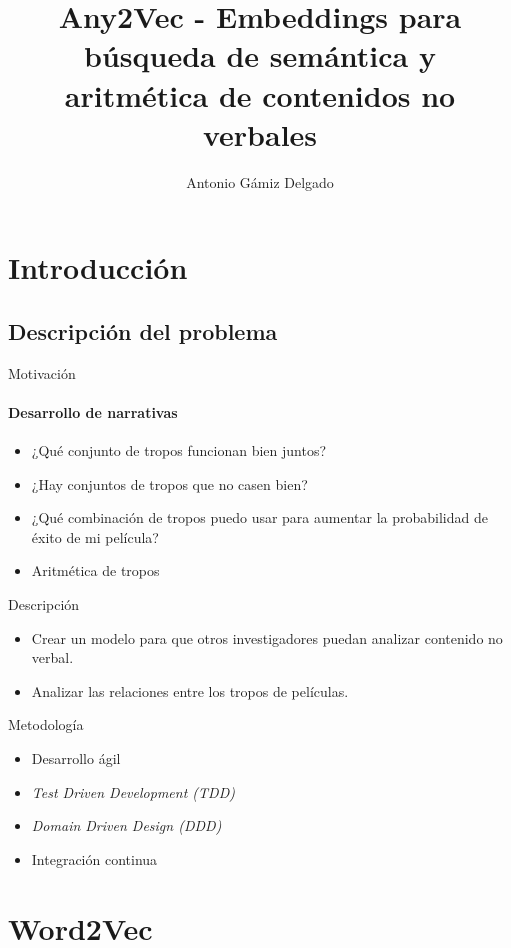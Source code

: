 \documentclass{beamer}
\title[Any2Vec - Embeddings para búsqueda de semántica y aritmética de contenidos no verbales]{Any2Vec - Embeddings para búsqueda de semántica y aritmética de contenidos no verbales}
\author[A. Gámiz]{Antonio Gámiz Delgado}
\begin{document}
	\typesetFrontSlides


\section{Introducción}

\subsection[Problema]{Descripción del problema}

\begin{frame}{Motivación}
  \framesubtitle{Desarrollo de narrativas}
	\begin{itemize}
    \item ¿Qué conjunto de tropos funcionan bien juntos?
    \item ¿Hay conjuntos de tropos que no casen bien?
    \item ¿Qué combinación de tropos puedo usar para aumentar la probabilidad de éxito de mi película?
    \item Aritmética de tropos
  \end{itemize}
\end{frame}

\begin{frame}{Descripción}
  \begin{itemize}
    \item Crear un modelo para que otros investigadores puedan analizar contenido no verbal.
    \item Analizar las relaciones entre los tropos de películas.
  \end{itemize}
\end{frame}

\begin{frame}{Metodología}
	\begin{itemize}
		\item Desarrollo ágil
		\item \textit{Test Driven Development (TDD)}
		\item \textit{Domain Driven Design (DDD)}
		\item Integración continua
	\end{itemize}
\end{frame}

\section{Word2Vec}
\end{document}
